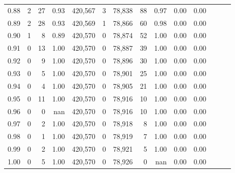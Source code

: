 \begin{tabular}{rrrrrrrrrrrrrr}
0.88 &       2 &     27 &  0.93 &  420,567 &        3 &  78,838 &      88 &  0.97 &  0.00 &      0.00 \\
0.89 &       2 &     28 &  0.93 &  420,569 &        1 &  78,866 &      60 &  0.98 &  0.00 &      0.00 \\
0.90 &       1 &      8 &  0.89 &  420,570 &        0 &  78,874 &      52 &  1.00 &  0.00 &      0.00 \\
0.91 &       0 &     13 &  1.00 &  420,570 &        0 &  78,887 &      39 &  1.00 &  0.00 &      0.00 \\
0.92 &       0 &      9 &  1.00 &  420,570 &        0 &  78,896 &      30 &  1.00 &  0.00 &      0.00 \\
0.93 &       0 &      5 &  1.00 &  420,570 &        0 &  78,901 &      25 &  1.00 &  0.00 &      0.00 \\
0.94 &       0 &      4 &  1.00 &  420,570 &        0 &  78,905 &      21 &  1.00 &  0.00 &      0.00 \\
0.95 &       0 &     11 &  1.00 &  420,570 &        0 &  78,916 &      10 &  1.00 &  0.00 &      0.00 \\
0.96 &       0 &      0 &   nan &  420,570 &        0 &  78,916 &      10 &  1.00 &  0.00 &      0.00 \\
0.97 &       0 &      2 &  1.00 &  420,570 &        0 &  78,918 &       8 &  1.00 &  0.00 &      0.00 \\
0.98 &       0 &      1 &  1.00 &  420,570 &        0 &  78,919 &       7 &  1.00 &  0.00 &      0.00 \\
0.99 &       0 &      2 &  1.00 &  420,570 &        0 &  78,921 &       5 &  1.00 &  0.00 &      0.00 \\
1.00 &       0 &      5 &  1.00 &  420,570 &        0 &  78,926 &       0 &   nan &  0.00 &      0.00 \\
\bottomrule
\end{tabular}
